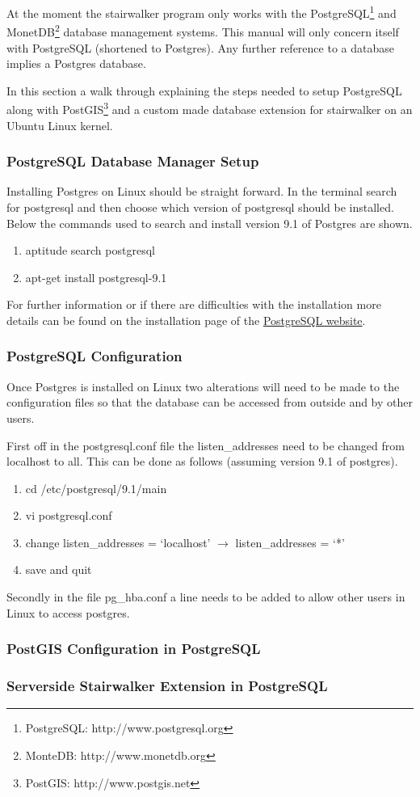 At the moment the stairwalker program only works with the PostgreSQL\footnote{PostgreSQL: http://www.postgresql.org} and MonetDB\footnote{MonteDB: http://www.monetdb.org} database management systems. This manual will only concern itself with PostgreSQL (shortened to Postgres). Any further reference to a database implies a Postgres database.

In this section a walk through explaining the steps needed to setup PostgreSQL along with PostGIS\footnote{PostGIS: http://www.postgis.net} and a custom made database extension for stairwalker on an Ubuntu Linux kernel.

\subsubsection{PostgreSQL Database Manager Setup}
Installing Postgres on Linux should be straight forward. In the terminal search for postgresql and then choose which version of postgresql should be installed. Below the commands used to search and install version 9.1 of Postgres are shown.
\begin{enumerate}
\item aptitude search postgresql
\item apt-get install postgresql-9.1
\end{enumerate}
For further information or if there are difficulties with the installation more details can be found on the installation page of the \href{http://www.postgresql.org/download/}{PostgreSQL website}.  

\subsubsection{PostgreSQL Configuration}
Once Postgres is installed on Linux two alterations will need to be made to the configuration files so that the database can be accessed from outside and by other users.

First off in the postgresql.conf file the listen\_addresses need to be changed from localhost to all. This can be done as follows (assuming version 9.1 of postgres).

\begin{enumerate}
\item cd /etc/postgresql/9.1/main
\item vi postgresql.conf
\item change listen\_addresses = `localhost' $\rightarrow$ listen\_addresses = `*'
\item save and quit
\end{enumerate}

Secondly in the file pg\_hba.conf a line needs to be added to allow other users in Linux to access postgres.

\subsubsection{PostGIS Configuration in PostgreSQL}

\subsubsection{Serverside Stairwalker Extension in PostgreSQL}